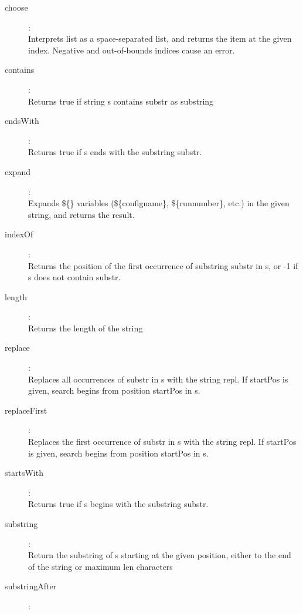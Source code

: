 \begin{description}
\item[choose]:  \\
    Interprets list as a space-separated list, and returns the item at the given index. Negative and out-of-bounds indices cause an error.
\item[contains]:  \\
    Returns true if string s contains substr as substring
\item[endsWith]:  \\
    Returns true if s ends with the substring substr.
\item[expand] :  \\
    Expands \$\{\} variables (\$\{configname\}, \$\{runnumber\}, etc.) in the given string, and returns the result.
\item[indexOf]:  \\
    Returns the position of the first occurrence of substring substr in s, or -1 if s does not contain substr.
\item[length]:  \\
    Returns the length of the string
\item[replace]:  \\
    Replaces all occurrences of substr in s with the string repl. If startPos is given, search begins from position startPos in s.
\item[replaceFirst]:  \\
    Replaces the first occurrence of substr in s with the string repl. If startPos is given, search begins from position startPos in s.
\item[startsWith]:  \\
    Returns true if s begins with the substring substr.
\item[substring]:  \\
    Return the substring of s starting at the given position, either to the end of the string or maximum len characters
\item[substringAfter]:  \\

\end{description}
